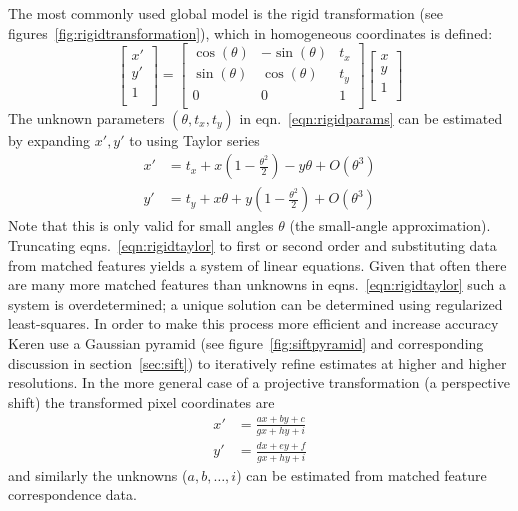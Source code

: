 The most commonly used global model is the rigid transformation (see figures~\ref{fig:rigidtransformation}), which in homogeneous coordinates is defined:
\begin{equation}
	\begin{bmatrix}
		x' \\
		y' \\
		1  \\
	\end{bmatrix} =
	\begin{bmatrix}
		\cos(\theta) & -\sin(\theta) & t_x \\
		\sin(\theta) & \cos(\theta)  & t_y \\
		0            & 0             & 1   \\
	\end{bmatrix}
	\begin{bmatrix}
		x \\
		y \\
		1 \\
	\end{bmatrix}
	\label{eqn:rigidparams}
\end{equation}
The unknown parameters \((\theta, t_x, t_y)\) in eqn.~\eqref{eqn:rigidparams} can be estimated by expanding \(x', y'\) to using Taylor series
\begin{equation}
	\begin{split}
		x' &= t_x + x\left( 1 - \frac{\theta^2}{2} \right) - y\theta  + O(\theta^3) \\
		y' &= t_y + x \theta  + y\left( 1 - \frac{\theta^2}{2} \right) + O(\theta^3)
	\end{split}
	\label{eqn:rigidtaylor}
\end{equation}
Note that this is only valid for small angles \(\theta\) (the small-angle approximation\cite{keren1988}).
%
Truncating eqns.~\eqref{eqn:rigidtaylor} to first or second order and substituting data from matched features yields a system of linear equations.
%
Given that often there are many more matched features than unknowns in eqns.~\eqref{eqn:rigidtaylor} such a system is overdetermined; a unique solution can be determined using regularized least-squares.
%
In order to make this process more efficient and increase accuracy Keren \etal\cite{keren1988} use a Gaussian pyramid (see figure~\ref{fig:siftpyramid} and corresponding discussion in section~\ref{sec:sift}) to iteratively refine estimates at higher and higher resolutions.
%
In the more general case of a projective transformation (a perspective shift) the transformed pixel coordinates are
\begin{equation}
	\begin{split}
		x' & = \frac{ax+by+c}{gx+hy+i} \\
		y' & = \frac{dx+ey+f}{gx+hy+i}
		\label{eqn:projectivetf}
	\end{split}
\end{equation}
and similarly the unknowns (\(a,b,\dots, i\)) can be estimated from matched feature correspondence data.


